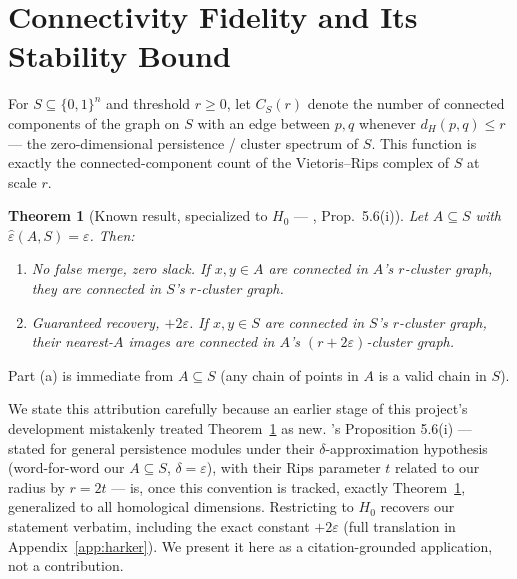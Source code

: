 \documentclass[11pt]{article}
\newtheorem{theorem}{Theorem}[section]
\theoremstyle{definition}
\theoremstyle{remark}
\newcommand{\dH}{d_H}
\newcommand{\epshat}{\hat\varepsilon}
\begin{document}
\section{Connectivity Fidelity and Its Stability Bound}
\label{sec:stability}

For $S \subseteq \{0,1\}^n$ and threshold $r \ge 0$, let $C_S(r)$ denote the number of connected components of the graph on $S$ with an edge between $p,q$ whenever $\dH(p,q) \le r$ --- the zero-dimensional persistence / cluster spectrum of $S$. This function is exactly the connected-component count of the Vietoris--Rips complex of $S$ at scale $r$.

\begin{theorem}[Known result, specialized to $H_0$ --- \citealp{harker2019comparison}, Prop.\ 5.6(i)]
\label{thm:stability}
Let $A \subseteq S$ with $\epshat(A,S) = \varepsilon$. Then:
\begin{enumerate}[label=(\alph*)]
\item \emph{No false merge, zero slack.} If $x,y \in A$ are connected in $A$'s $r$-cluster graph, they are connected in $S$'s $r$-cluster graph.
\item \emph{Guaranteed recovery, $+2\varepsilon$.} If $x,y \in S$ are connected in $S$'s $r$-cluster graph, their nearest-$A$ images are connected in $A$'s $(r+2\varepsilon)$-cluster graph.
\end{enumerate}
\end{theorem}

Part (a) is immediate from $A \subseteq S$ (any chain of points in $A$ is a valid chain in $S$).

We state this attribution carefully because an earlier stage of this project's development mistakenly treated Theorem~\ref{thm:stability} as new. \citeauthor{harker2019comparison}'s Proposition 5.6(i) --- stated for general persistence modules under their $\delta$-approximation hypothesis (word-for-word our $A \subseteq S$, $\delta = \varepsilon$), with their Rips parameter $t$ related to our radius by $r=2t$ --- is, once this convention is tracked, exactly Theorem~\ref{thm:stability}, generalized to all homological dimensions. Restricting to $H_0$ recovers our statement verbatim, including the exact constant $+2\varepsilon$ (full translation in Appendix~\ref{app:harker}). We present it here as a citation-grounded application, not a contribution.
\end{document}
